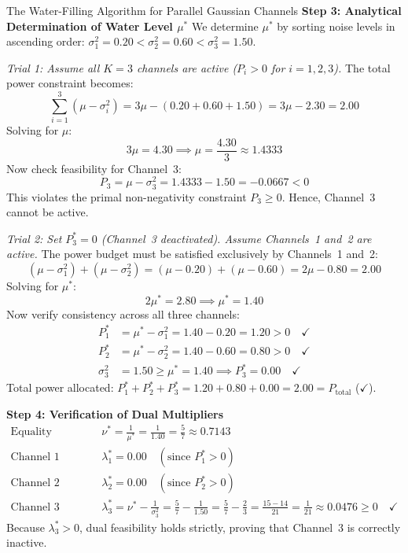 \begin{examplebox}[breakable]{The Water-Filling Algorithm for Parallel Gaussian Channels}
\textbf{Step 3: Analytical Determination of Water Level $\mu^*$}
We determine $\mu^*$ by sorting noise levels in ascending order: $\sigma_1^2 = 0.20 < \sigma_2^2 = 0.60 < \sigma_3^2 = 1.50$.

\emph{Trial 1: Assume all $K=3$ channels are active ($P_i > 0$ for $i=1, 2, 3$).}
The total power constraint becomes:
\begin{equation}
\sum_{i=1}^3 (\mu - \sigma_i^2) = 3\mu - (0.20 + 0.60 + 1.50) = 3\mu - 2.30 = 2.00
\end{equation}
Solving for $\mu$:
\begin{equation}
3\mu = 4.30 \implies \mu = \frac{4.30}{3} \approx 1.4333
\end{equation}
Now check feasibility for Channel~3:
\begin{equation}
P_3 = \mu - \sigma_3^2 = 1.4333 - 1.50 = -0.0667 < 0
\end{equation}
This violates the primal non-negativity constraint $P_3 \ge 0$. Hence, Channel~3 cannot be active.

\emph{Trial 2: Set $P_3^* = 0$ (Channel~3 deactivated). Assume Channels~1 and~2 are active.}
The power budget must be satisfied exclusively by Channels~1 and~2:
\begin{equation}
(\mu - \sigma_1^2) + (\mu - \sigma_2^2) = (\mu - 0.20) + (\mu - 0.60) = 2\mu - 0.80 = 2.00
\end{equation}
Solving for $\mu^*$:
\begin{equation}
2\mu^* = 2.80 \implies \mu^* = 1.40
\end{equation}
Now verify consistency across all three channels:
\begin{align}
P_1^* &= \mu^* - \sigma_1^2 = 1.40 - 0.20 = 1.20 > 0 \quad \checkmark \\
P_2^* &= \mu^* - \sigma_2^2 = 1.40 - 0.60 = 0.80 > 0 \quad \checkmark \\
\sigma_3^2 &= 1.50 \ge \mu^* = 1.40 \implies P_3^* = 0.00 \quad \checkmark
\end{align}
Total power allocated: $P_1^* + P_2^* + P_3^* = 1.20 + 0.80 + 0.00 = 2.00 = P_{\text{total}}$ ($\checkmark$).

\textbf{Step 4: Verification of Dual Multipliers}
\begin{align}
\text{Equality Multiplier: } & \nu^* = \frac{1}{\mu^*} = \frac{1}{1.40} = \frac{5}{7} \approx 0.7143 \\
\text{Channel 1 Multiplier: } & \lambda_1^* = 0.00 \quad (\text{since } P_1^* > 0) \\
\text{Channel 2 Multiplier: } & \lambda_2^* = 0.00 \quad (\text{since } P_2^* > 0) \\
\text{Channel 3 Multiplier: } & \lambda_3^* = \nu^* - \frac{1}{\sigma_3^2} = \frac{5}{7} - \frac{1}{1.50} = \frac{5}{7} - \frac{2}{3} = \frac{15 - 14}{21} = \frac{1}{21} \approx 0.0476 \ge 0 \quad \checkmark
\end{align}
Because $\lambda_3^* > 0$, dual feasibility holds strictly, proving that Channel~3 is correctly inactive.


\end{examplebox}
